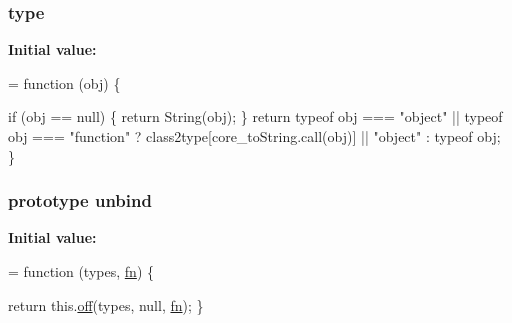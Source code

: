 \subsubsection[{\texorpdfstring{type}{type}}]{ type}\hypertarget{jquery-2_82_81-vsdoc_8js_a3940565e83a9bfd10d95ffd27536da91}{}\label{jquery-2_82_81-vsdoc_8js_a3940565e83a9bfd10d95ffd27536da91}
{\bfseries Initial value\+:}
\begin{DoxyCode}
= \textcolor{keyword}{function} (obj) \{
        

        \textcolor{keywordflow}{if} (obj == null) \{
            \textcolor{keywordflow}{return} String(obj);
        \}
        \textcolor{keywordflow}{return} typeof obj === \textcolor{stringliteral}{"object"} || typeof obj === \textcolor{stringliteral}{"function"} ?
            class2type[core\_toString.call(obj)] || \textcolor{stringliteral}{"object"} :
            typeof obj;
    \}
\end{DoxyCode}
\subsubsection[{\texorpdfstring{unbind}{unbind}}]{ {\bf prototype} unbind}\hypertarget{jquery-2_82_81-vsdoc_8js_af46ad9e68add9abd540e1b4f9da37b62}{}\label{jquery-2_82_81-vsdoc_8js_af46ad9e68add9abd540e1b4f9da37b62}
{\bfseries Initial value\+:}
\begin{DoxyCode}
= \textcolor{keyword}{function} (types, \hyperlink{jquery-2_82_81-vsdoc_8js_acef6bdaf6b9b20fdcca1ea86f0902c3b}{fn}) \{
        

        \textcolor{keywordflow}{return} this.\hyperlink{jquery-2_82_81-vsdoc_8js_abd3345ae76b0b1425e11cd916e7bc97c}{off}(types, null, \hyperlink{jquery-2_82_81-vsdoc_8js_acef6bdaf6b9b20fdcca1ea86f0902c3b}{fn});
    \}
\end{DoxyCode}
